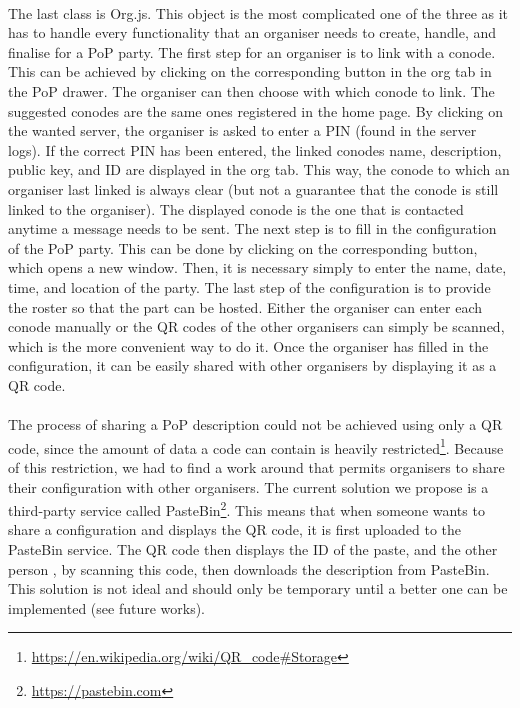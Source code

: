\paragraph{}
The last class is Org.js. This object is the most complicated one of the three as it has to handle every functionality that an organiser needs to create, handle, and finalise for a PoP party. The first step for an organiser is to link with a conode. This can be achieved by clicking on the corresponding button in the org tab in the PoP drawer. The organiser can then choose with which conode to link. The suggested conodes are the same ones registered in the home page. By clicking on the wanted server, the organiser is asked to enter a PIN (found in the server logs). If the correct PIN has been entered, the linked conodes name, description, public key, and ID are displayed in the org tab. This way, the conode to which an organiser last linked is always clear (but not a guarantee that the conode is still linked to the organiser). The displayed conode is the one that is contacted anytime a message needs to be sent. The next step is to fill in the configuration of the PoP party. This can be done by clicking on the corresponding button, which opens a new window. Then, it is necessary simply to enter the name, date, time, and location of the party. The last step of the configuration is to provide the roster so that the part can be hosted. Either the organiser can enter each conode manually or the QR codes of the other organisers can simply be scanned, which is the more convenient way to do it. Once the organiser has filled in the configuration, it can be easily shared with other organisers by displaying it as a QR code.

\paragraph{}
The process of sharing a PoP description could not be achieved using only a QR code, since the amount of data a code can contain is heavily restricted\footnote{\url{https://en.wikipedia.org/wiki/QR_code#Storage}}. Because of this restriction, we had to find a work around that permits organisers to share their configuration with other organisers. The current solution we propose is a third-party service called PasteBin\footnote{\url{https://pastebin.com}}. This means that when someone wants to share a configuration and displays the QR code, it is first uploaded to the PasteBin service. The QR code then displays the ID of the paste, and the other person , by scanning this code, then downloads the description from PasteBin. This solution is not ideal and should only be temporary until a better one can be implemented (see future works).

